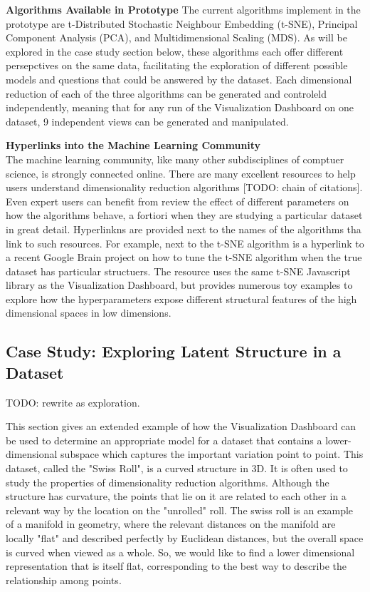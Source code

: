 \documentclass{sigchi}
\begin{document}
\textbf{Algorithms Available in Prototype}
The current algorithms implement in the prototype are t-Distributed Stochastic Neighbour Embedding (t-SNE), Principal Component Analysis (PCA), and Multidimensional Scaling (MDS). As will be explored in the case study section below, these algorithms each offer different persepctives on the same data, facilitating the exploration of different possible models and questions that could be answered by the dataset. Each dimensional reduction of each of the three algorithms can be generated and controleld independently, meaning that for any run of the Visualization Dashboard on one dataset, 9 independent views can be generated and manipulated.

\textbf{Hyperlinks into the Machine Learning Community}\\
The machine learning community, like many other subdisciplines of comptuer science, is strongly connected online. There are many excellent resources to help users understand dimensionality reduction algorithms [TODO: chain of citations]. Even expert users can benefit from review the effect of different parameters on how the algorithms behave, a fortiori when they are studying a particular dataset in great detail. Hyperlinkns are provided next to the names of the algorithms tha link to such resources. For example, next to the t-SNE algorithm is a hyperlink to a recent Google Brain project on how to tune the t-SNE algorithm when the true dataset has particular structuers. The resource uses the same t-SNE Javascript library as the Visualization Dashboard, but provides numerous toy examples to explore how the hyperparameters expose different structural features of the high dimensional spaces in low dimensions. %
%
\subsection{Case Study: Exploring Latent Structure in a Dataset}
%
TODO: rewrite as exploration.

This section gives an extended example of how the Visualization Dashboard can be used to determine an appropriate model for a dataset that contains a lower-dimensional subspace which captures the important variation point to point. This dataset, called the "Swiss Roll", is a curved structure in 3D. It is often used to study the properties of dimensionality reduction algorithms. Although the structure has curvature, the points that lie on it are related to each other in a relevant way by the location on the "unrolled" roll. The swiss roll is an example of a manifold in geometry, where the relevant distances on the manifold are locally "flat" and described perfectly by Euclidean distances, but the overall space is curved when viewed as a whole. So, we would like to find a lower dimensional representation that is itself flat, corresponding to the best way to describe the relationship among points.
\end{document}
